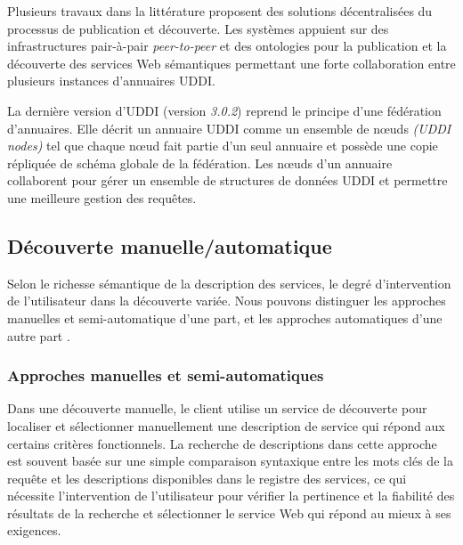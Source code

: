     Plusieurs travaux dans la littérature proposent des solutions
    décentralisées du processus de publication et découverte. Les
    systèmes \cite{paolucci2003using, schmidt2004peer,
      verma2005meteor} appuient sur des infrastructures pair-à-pair
    \textit{peer-to-peer} et des ontologies pour la publication et la
    découverte des services Web sémantiques permettant une forte
    collaboration entre plusieurs instances d'annuaires \textsc{UDDI}.

    La dernière version d'\textsc{UDDI} \cite{oasis2005specification}
    (version \textit{3.0.2}) reprend le principe d'une fédération
    d'annuaires. Elle décrit un annuaire \textsc{UDDI} comme un
    ensemble de nœuds \textit{(UDDI nodes)} tel que chaque nœud fait
    partie d'un seul annuaire et possède une copie répliquée de schéma
    globale de la fédération. Les nœuds d'un annuaire collaborent pour
    gérer un ensemble de structures de données \textsc{UDDI} et
    permettre une meilleure gestion des requêtes.

  \subsection{Découverte manuelle/automatique}
  \label{sec:ws-desc:manual-vs-auto}

  Selon le richesse sémantique de la description des services, le
  degré d'intervention de l'utilisateur dans la découverte
  variée. Nous pouvons distinguer les approches manuelles et
  semi-automatique d'une part, et les approches automatiques d'une
  autre part \cite{elie2010,garofalakis2004web}.

    \subsubsection{Approches manuelles et semi-automatiques}
    \label{ws-desc:manual}

    Dans une découverte manuelle, le client utilise un service de
    découverte pour localiser et sélectionner manuellement une
    description de service qui répond aux certains critères
    fonctionnels. La recherche de descriptions dans cette approche est
    souvent basée sur une simple comparaison syntaxique entre les mots
    clés de la requête et les descriptions disponibles dans le
    registre des services, ce qui nécessite l'intervention de
    l'utilisateur pour vérifier la pertinence et la fiabilité des
    résultats de la recherche et sélectionner le service Web qui
    répond au mieux à ses exigences.

